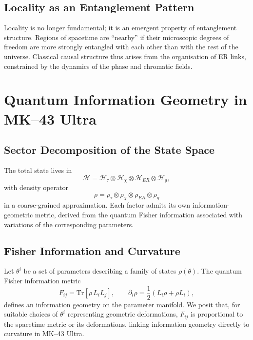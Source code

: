 \section{Locality as an Entanglement Pattern}

Locality is no longer fundamental; it is an emergent property of entanglement structure.
Regions of spacetime are ``nearby'' if their microscopic degrees of freedom are more strongly entangled with each other than with the rest of the universe.
Classical causal structure thus arises from the organisation of ER links, constrained by the dynamics of the phase and chromatic fields.


\chapter{Quantum Information Geometry in MK--43 Ultra}

\section{Sector Decomposition of the State Space}

The total state lives in
\[
  \mathcal{H} = \mathcal{H}_\tau \otimes \mathcal{H}_\chi \otimes \mathcal{H}_{ER} \otimes \mathcal{H}_g,
\]
with density operator
\[
  \rho = \rho_\tau \otimes \rho_\chi \otimes \rho_{ER} \otimes \rho_g
\]
in a coarse-grained approximation.
Each factor admits its own information-geometric metric, derived from the quantum Fisher information associated with variations of the corresponding parameters.

\section{Fisher Information and Curvature}

Let $\theta^i$ be a set of parameters describing a family of states $\rho(\theta)$.
The quantum Fisher information metric
\[
  F_{ij} = \mathrm{Tr}\left[\rho\, L_i L_j\right], \qquad \partial_i \rho = \frac{1}{2}\left(L_i\rho + \rho L_i\right),
\]
defines an information geometry on the parameter manifold.
We posit that, for suitable choices of $\theta^i$ representing geometric deformations, $F_{ij}$ is proportional to the spacetime metric or its deformations, linking information geometry directly to curvature in MK--43 Ultra.

